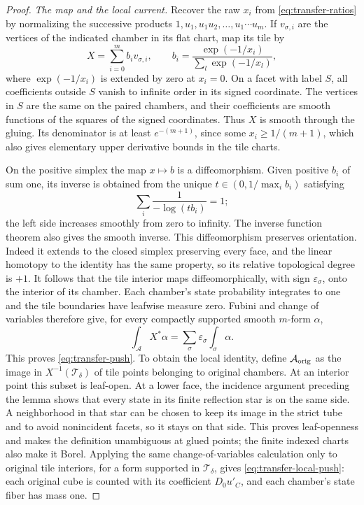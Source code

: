 \begin{proof}
\medskip\noindent\emph{The map and the local current.}
Recover the raw \(x_i\) from \eqref{eq:transfer-ratios} by normalizing
the successive products \(1,u_1,u_1u_2,\ldots,u_1\cdots u_m\).
If \(v_{\sigma,i}\) are the vertices of the indicated chamber in its
flat chart, map its tile by
\begin{equation}\label{eq:transfer-tile-map}
 X=\sum_{i=0}^m b_i v_{\sigma,i},\qquad
 b_i=\frac{\exp(-1/x_i)}{\sum_l\exp(-1/x_l)},
\end{equation}
where \(\exp(-1/x_i)\) is extended by zero at \(x_i=0\).  On a facet
with label \(S\), all coefficients outside \(S\) vanish to infinite
order in its signed coordinate.  The vertices in \(S\) are the same
on the paired chambers, and their coefficients are smooth functions
of the squares of the signed coordinates.  Thus \(X\) is smooth
through the gluing.  Its denominator is at least \(e^{-(m+1)}\), since
some \(x_i\geq1/(m+1)\), which also gives elementary upper derivative
bounds in the tile charts.

On the positive simplex the map \(x\mapsto b\) is a diffeomorphism.
Given positive \(b_i\) of sum one, its inverse is obtained from the
unique \(t\in(0,1/\max_i b_i)\) satisfying
\[
                    \sum_i\frac1{-\log(tb_i)}=1;
\]
the left side increases smoothly from zero to infinity.  The inverse
function theorem also gives the smooth inverse.  This diffeomorphism
preserves orientation.  Indeed it extends to the closed simplex
preserving every face, and the linear homotopy to the identity has
the same property, so its relative topological degree is \(+1\).
It follows that the tile interior maps diffeomorphically, with sign
\(\varepsilon_\sigma\), onto the interior of its chamber.  Each
chamber's state probability integrates to one and the tile boundaries
have leafwise measure zero.  Fubini and change of variables therefore
give, for every compactly supported smooth \(m\)-form \(\alpha\),
\[
       \int_{\mathcal A}X^*\alpha
          =\sum_\sigma\varepsilon_\sigma\int_\sigma\alpha.
\]
This proves \eqref{eq:transfer-push}.  To obtain the local identity,
define \(\mathcal A_{\rm orig}\) as the image in
\(X^{-1}(\mathcal T_\delta)\) of tile points belonging to original
chambers.  At an interior point this subset is leaf-open.  At a lower
face, the incidence argument preceding the lemma shows that every state
in its finite reflection star is on the same side.  A neighborhood in
that star can be chosen to keep its image in the strict tube and to
avoid nonincident facets, so it stays on that side.  This proves
leaf-openness and makes the definition unambiguous at glued points;
the finite indexed charts also make it Borel.  Applying the same
change-of-variables calculation only to original tile interiors, for
a form supported in \(\mathcal T_\delta\), gives
\eqref{eq:transfer-local-push}: each original cube is counted with
its coefficient \(D_0u'_C\), and each chamber's state fiber has mass one.


\end{proof}
